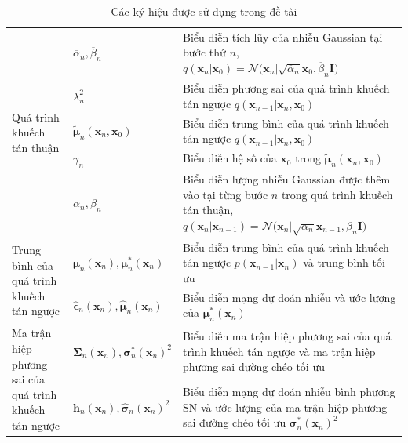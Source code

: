 \documentclass[14pt, a4paper]{article}
\numberwithin{equation}{section}
\numberwithin{figure}{section}
\numberwithin{dl}{section}
\numberwithin{md}{section}
\numberwithin{bd}{section}
\numberwithin{dn}{section}
\numberwithin{hq}{section}
\begin{document}
    \begin{table}[h!]
        \caption{Các ký hiệu được sử dụng trong đề tài}
        \begin{tabular} [c c c] {m{4cm}  m{2.5cm}  m{8cm}}
            \hline
            \multirow{5}{4cm}{Quá trình khuếch tán thuận} & $\overline{\alpha}_n, \overline{\beta}_n$ & Biểu diễn tích lũy của nhiễu Gaussian tại bước thứ $n$, $q(\boldsymbol{x}_n \vert \boldsymbol{x}_0)=\mathcal{N} \big( \boldsymbol{x}_n \vert \sqrt{\overline{\alpha}_n} \boldsymbol{x}_0, \overline{\beta}_n \boldsymbol{I} \big)$ \\ \cline{2-3}
            & $\lambda_n^2$ & Biểu diễn phương sai của quá trình khuếch tán ngược $q(\boldsymbol{x}_{n-1} \vert \boldsymbol{x}_n, \boldsymbol{x}_0)$ \\ \cline{2-3}
            & $\tilde{\boldsymbol{\mu}}_n (\boldsymbol{x}_n, \boldsymbol{x}_0)$ & Biểu diễn trung bình của quá trình khuếch tán ngược $q(\boldsymbol{x}_{n-1} \vert \boldsymbol{x}_n, \boldsymbol{x}_0)$ \\ \cline{2-3}
            & $\gamma_n$ & Biểu diễn hệ số của $\boldsymbol{x}_0$ trong $\tilde{\boldsymbol{\mu}}_n (\boldsymbol{x}_n, \boldsymbol{x}_0)$ \\ \cline{2-3}
            & $\alpha_n, \beta_n$ & Biểu diễn lượng nhiễu Gaussian được thêm vào tại từng bước $n$ trong quá trình khuếch tán thuận, $q(\boldsymbol{x}_n \vert \boldsymbol{x}_{n-1})=\mathcal{N}\big( \boldsymbol{x}_n \vert \sqrt{\alpha_n} \boldsymbol{x}_{n-1}, \beta_n \boldsymbol{I} \big)$ \\
            \hline
            \multirow{2}{4cm}{Trung bình của quá trình khuếch tán ngược} & $\boldsymbol{\mu}_n (\boldsymbol{x}_n), \boldsymbol{\mu}_n^{\ast} (\boldsymbol{x}_n)$ & Biểu diễn trung bình của quá trình khuếch tán ngược $p(\boldsymbol{x}_{n-1} \vert \boldsymbol{x}_n)$ và trung bình tối ưu \\ \cline{2-3}
            & $\hat{\boldsymbol{\epsilon}}_n (\boldsymbol{x}_n), \hat{\boldsymbol{\mu}}_n (\boldsymbol{x}_n)$ & Biểu diễn mạng dự đoán nhiễu và ước lượng của $\boldsymbol{\mu}_n^{\ast} (\boldsymbol{x}_n)$ \\
            \hline
            \multirow{4}{4cm}{Ma trận hiệp phương sai của quá trình khuếch tán ngược} & $\boldsymbol{\Sigma}_n (\boldsymbol{x}_n), \boldsymbol{\sigma}_n^{\ast} (\boldsymbol{x}_n)^2$ & Biểu diễn ma trận hiệp phương sai của quá trình khuếch tán ngược và ma trận hiệp phương sai đường chéo tối ưu \\ \cline{2-3}
            & $\boldsymbol{h}_n (\boldsymbol{x}_n), \hat{\boldsymbol{\sigma}}_n (\boldsymbol{x}_n)^2$ & Biểu diễn mạng dự đoán nhiễu bình phương SN và ước lượng của ma trận hiệp phương sai đường chéo tối ưu $\boldsymbol{\sigma}_n^{\ast} (\boldsymbol{x}_n)^2$ \\ \cline{2-3}

\end{tabular}
\end{table}
\end{document}
